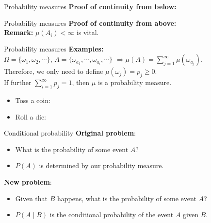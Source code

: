\documentclass [aspectratio=169]{beamer}
\begin{document}
\begin{frame}{Probability measures}
    \textbf{Proof of continuity from below:}
\vspace{2.5in}
\end{frame}

\begin{frame}{Probability measures}
    \textbf{Proof of continuity from above:}
\vspace{1.5in}\\
\textbf{Remark:} $\mu(A_i) < \infty$ is vital. %
\vspace{1in}
\end{frame}


\begin{frame}{Probability measures}
\textbf{Examples:}\\
\vspace{0.1in}
$\Omega = \{\omega_1, \omega_2, \cdots\}$, $A = \{\omega_{a_1}, \cdots, \omega_{a_i}, \cdots\}$ $\Rightarrow \mu(A) = \sum_{j = 1}^\infty \mu(\omega_{a_j})$.\\
Therefore, we only need to define $\mu(\omega_j) = p_j \ge 0$. \\
If further $\sum_{i = 1}^\infty p_j = 1$, then $\mu$ is a probability measure. 
\vspace{0.1in}
\begin{itemize}
    \item Toss a coin: \\
    \vspace{0.5in}
    \item Roll a die: 
    \vspace{0.5in}
\end{itemize}
\end{frame}

\begin{frame}{Conditional probability}
\vspace{0.1in}
\textbf{Original problem}:
\begin{itemize}
    \item What is the probability of some event $A$?
    \item $P(A)$ is determined by our probability measure.
\end{itemize}
\vspace{0.1in}
\textbf{New problem}:
\begin{itemize}
    \item Given that $B$ happens, what is the probability of some event $A$?
    \item $P(A \mid B)$ is the conditional probability of the event $A$ given $B$.
\end{itemize}
\vspace{0.1in}
\end{frame}
\end{document}
